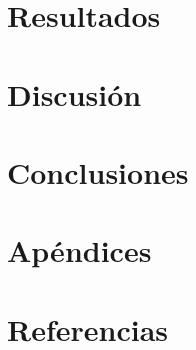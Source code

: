 \documentclass[a4paper,11pt]{article}
\begin{document}
\section{Resultados}



\section{Discusión}



\section{Conclusiones}



\section{Apéndices}



\section{Referencias}


\end{document}
